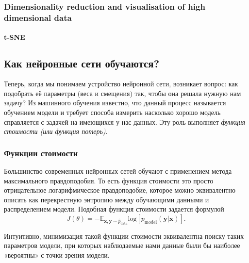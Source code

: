 

\subsubsection{\color{red}Dimensionality reduction and visualisation of high dimensional data}

\paragraph{\color{red}t-SNE}

\subsection{Как нейронные сети обучаются?}

Теперь, когда мы понимаем устройство нейронной сети, возникает вопрос: 
как подобрать её параметры (веса и смещения) так, чтобы она решала нужную нам задачу? 
Из машинного обучения известно, что данный процесс называется обучением модели и требует 
способа измерить насколько хорошо модель справляется с задачей на имеющихся у нас данных. 
Эту роль выполняет \textit{функция стоимости (или функция потерь)}.

\subsubsection{Функции стоимости}

Большинство современных нейронных сетей обучают с применением метода максимального 
правдоподобия. То есть функция стоимости это просто отрицательное логарифмическое 
правдоподобие, которое можно эквивалентно описать как перекрестную энтропию 
между обучающими данными и распределением модели. Подобная функция стоимости 
задается формулой 
\begin{equation*}
    J(\theta) = - \mathbb{E}_{\bm{x},\bm{y} \sim \hat{p}_{\text{data}}} \text{log} \left[ p_\text{model} (\bm{y} | \bm{x}) \right].
\end{equation*}

Интуитивно, минимизация такой функции стоимости эквивалентна поиску таких параметров 
модели, при которых наблюдаемые нами данные были бы наиболее «вероятны» с точки 
зрения модели.

